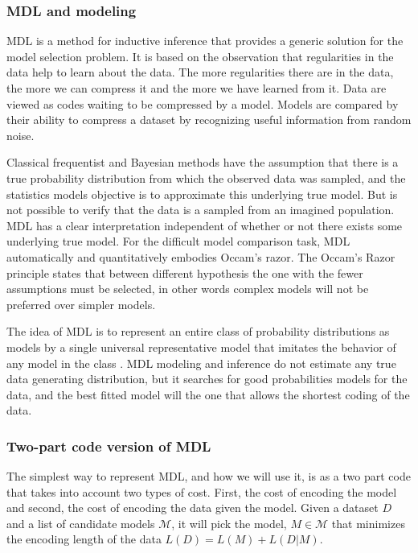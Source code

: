 \subsubsection{MDL and modeling}

MDL is a method for inductive inference that provides a generic solution for the model selection problem. It is based on the observation that regularities in the data help to learn about the data. The more regularities there are in the data, the more we can compress it and the more we have learned from it. Data are viewed as codes waiting to be compressed by a model. Models are compared by their ability to compress a dataset by recognizing useful information from random noise. 

Classical frequentist and Bayesian methods have the assumption that there is a true probability distribution from which the observed data was sampled, and the statistics models objective is to approximate this underlying true model. But is not possible to verify that the data is a sampled from an imagined population. MDL has a clear interpretation independent of whether or not there exists some underlying true model. For the difficult model comparison task, MDL automatically and quantitatively embodies Occam's razor. The Occam's Razor principle states that between different hypothesis the one with the fewer assumptions must be selected, in other words complex models will not be preferred over simpler models.

The idea of MDL is to represent an entire class of probability distributions as models by a single universal representative model that imitates the behavior of any model in the class \cite{Barron1998}. MDL modeling and inference do not estimate any true data generating distribution, but it searches for good probabilities models for the data, and the best fitted model will the one that allows the shortest coding of the data. 

\subsubsection{Two-part code version of MDL}
The simplest way to represent MDL, and how we will use it, is as a two part code that takes into account two types of cost. First, the cost of encoding the model and second, the cost of encoding the data given the model. Given a dataset $D$ and a list of candidate models $\mathcal{M}$, it will pick the model, $M \in \mathcal{M}$ that minimizes the encoding length of the data $L(D)=L(M)+L(D|M).$

